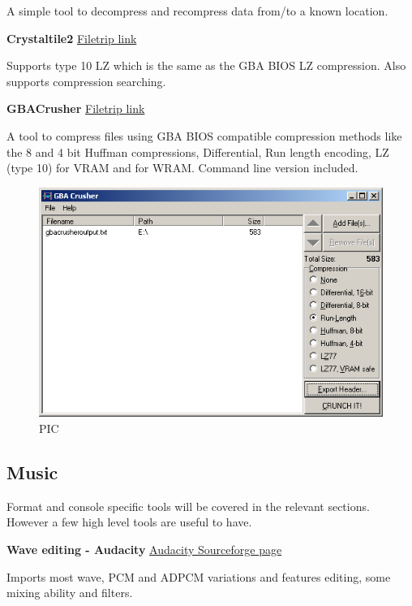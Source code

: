 \documentclass[
]{book}
\begin{document}
A simple tool to decompress and recompress data from/to a known location.

\textbf{Crystaltile2} \href{http://filetrip.net/f23649-CrystalTile2-2010-09-06.html}{Filetrip link}

Supports type 10 LZ which is the same as the GBA BIOS LZ compression. Also supports compression searching.

\textbf{GBACrusher} \href{http://filetrip.net/gba-downloads/tools-utilities/download-gba-crusher-010-f28823.html}{Filetrip link}

A tool to compress files using GBA BIOS compatible compression methods like the 8 and 4 bit Huffman compressions, Differential, Run length encoding, LZ (type 10) for VRAM and for WRAM. Command line version included.

\begin{figure}
\centering
\includegraphics{images/16_home_fast6191_romhackingguide_unrenamed_file___hackingguidecompressionshowcasegbacrusher_1.png}
\caption{PIC}
\end{figure}

\hypertarget{music}{%
\subsection{Music}\label{music}}

Format and console specific tools will be covered in the relevant sections. However a few high level tools are useful to have.

\textbf{Wave editing - Audacity} \href{http://audacity.sourceforge.net/}{Audacity Sourceforge page}

Imports most wave, PCM and ADPCM variations and features editing, some mixing ability and filters.
\end{document}
